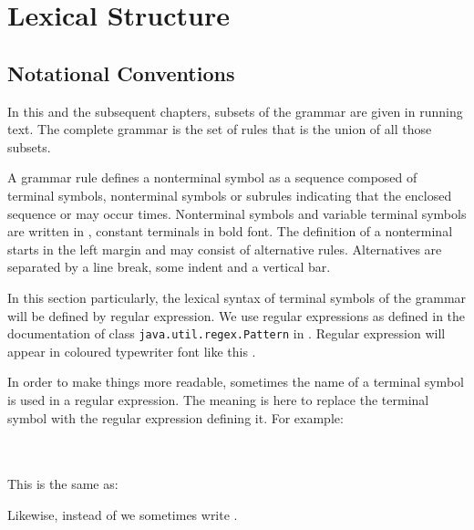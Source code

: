 
\chapter{Lexical Structure} \label{lexical structure}

\section{Notational Conventions}

In this and the subsequent chapters, subsets of the \frege{} grammar are given in running text. The complete grammar is the set of rules that is the union of all those subsets.

\par A
grammar rule defines a nonterminal symbol as a sequence composed of terminal symbols, nonterminal symbols or subrules indicating that the enclosed sequence  or may occur  times.
Nonterminal symbols and variable terminal symbols are written in , constant terminals in bold  font.
The definition of a nonterminal starts in the left margin and may
consist of alternative rules. Alternatives are separated by a
line break, some indent and a vertical bar.

\par In this section particularly, the lexical syntax of terminal symbols of the grammar will be defined by regular expression.
We use regular expressions as defined in the documentation of class
\texttt{java.util.regex.Pattern} in \cite{apidoc}. Regular expression
will appear in coloured typewriter font like this
.

In order to make things more readable, sometimes the name of a terminal symbol is used in a regular expression. The meaning is here to replace the terminal symbol with the regular expression defining it. For example:

\begin{flushleft}
  \\
   \\
This is the same as:\\
 
\end{flushleft}

Likewise, instead of  we sometimes write \oder{}.

